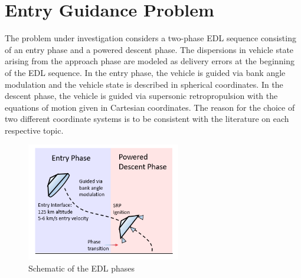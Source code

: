 \documentclass[letterpaper, paper,11pt]{AAS}
\begin{document}
\section{Entry Guidance Problem}
The problem under investigation considers a two-phase EDL sequence consisting of an entry phase and a powered descent phase. The dispersions in vehicle state arising from the approach phase are modeled as delivery errors at the beginning of the EDL sequence. In the entry phase, the vehicle is guided via bank angle modulation and the vehicle state is described in spherical coordinates. In the descent phase, the vehicle is guided via supersonic retropropulsion with the equations of motion given in Cartesian coordinates.  The reason for the choice of two different coordinate systems is to be consistent with the literature on each respective topic.

\begin{figure}[h!]
	\centering
	\includegraphics[width=0.6\textwidth]{EDLPhaseDiagram} 
	\caption{Schematic of the EDL phases}
	\label{fig_phases}
\end{figure}
\end{document}
